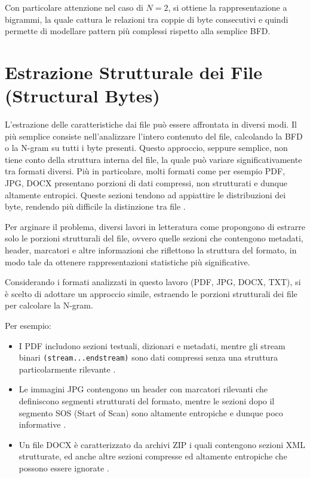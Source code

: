 \documentclass{report}
\begin{document}
\bigskip

Con particolare attenzione nel caso di $N=2$, si ottiene la rappresentazione a bigrammi, la quale cattura le relazioni tra coppie di byte consecutivi e 
quindi permette di modellare pattern più complessi rispetto alla semplice BFD.




\section{Estrazione Strutturale dei File (Structural Bytes)}

L'estrazione delle caratteristiche dai file può essere affrontata in diversi modi.
Il più semplice consiste nell'analizzare l'intero contenuto del file, calcolando la BFD o la N-gram su tutti i byte presenti.
Questo approccio, seppure semplice, non tiene conto della struttura interna del file, la quale può variare significativamente tra formati diversi.
Più in particolare, molti formati come per esempio PDF, JPG, DOCX presentano porzioni di dati compressi, non strutturati e dunque altamente entropici.
Queste sezioni tendono ad appiattire le distribuzioni dei byte, rendendo più difficile la distinzione tra file \cite{garfinkel2010future}.

\bigskip

Per arginare il problema, diversi lavori in letteratura come \cite{garfinkel2012dfxml} propongono di estrarre solo le porzioni 
strutturali del file, ovvero quelle sezioni che contengono metadati, header, marcatori e altre informazioni che riflettono la struttura del formato,
in modo tale da ottenere rappresentazioni statistiche più significative.

\bigskip

Considerando i formati analizzati in questo lavoro (PDF, JPG, DOCX, TXT), si è scelto di adottare un approccio simile,
estraendo le porzioni strutturali dei file per calcolare la N-gram.

Per esempio:
\begin{itemize}
    \item I PDF includono sezioni testuali, dizionari e metadati, mentre gli stream binari \texttt{(stream...endstream)} sono dati compressi senza una struttura particolarmente rilevante \cite{vanderknijff2009pdf}.
    \item Le immagini JPG contengono un header con marcatori rilevanti che definiscono segmenti strutturati del formato, mentre le sezioni dopo il segmento SOS (Start of Scan) sono altamente entropiche e dunque poco informative \cite{vandermeer2024jpeg}.
    \item Un file DOCX è caratterizzato da archivi ZIP i quali contengono sezioni XML strutturate, ed anche altre sezioni compresse ed altamente entropiche che possono essere ignorate \cite{garfinkel2009xml}.
\end{itemize}
\end{document}
